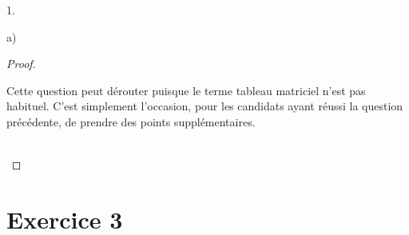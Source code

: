 \begin{noliste}{1.}
\begin{noliste}{a)}
    \begin{proof}~%
      \begin{remark}%
        Cette question peut dérouter puisque le terme \og tableau
        matriciel \fg{} n'est pas habituel. C'est simplement
        l'occasion, pour les candidats ayant réussi la question
        précédente, de prendre des points supplémentaires.
      \end{remark}~\\[-1.2cm]
    \end{proof}
 \end{noliste}
\end{noliste} 


\newpage


\section*{Exercice 3}

